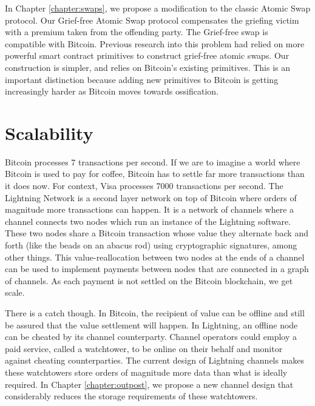 In Chapter \ref{chapter:swaps}, we propose a modification to the classic Atomic Swap protocol. Our Grief-free Atomic Swap protocol compensates the griefing victim with a premium taken from the offending party. The Grief-free swap is compatible with Bitcoin. Previous research into this problem had relied on more powerful smart contract primitives to construct grief-free atomic swaps. Our construction is simpler, and relies on Bitcoin's existing primitives. This is an important distinction because adding new primitives to Bitcoin is getting increasingly harder as Bitcoin moves towards ossification. 

\section{Scalability}
Bitcoin processes 7 transactions per second. If we are to imagine a world where Bitcoin is used to pay for coffee, Bitcoin has to settle far more transactions than it does now. For context, Visa processes 7000 transactions per second. The Lightning Network is a second layer network on top of Bitcoin where orders of magnitude more transactions can happen. It is a network of channels where a channel connects two nodes which run an instance of the Lightning software. These two nodes share a Bitcoin transaction whose value they alternate back and forth (like the beads on an abacus rod) using cryptographic signatures, among other things. This value-reallocation between two nodes at the ends of a channel can be used to implement payments between nodes that are connected in a graph of channels. As each payment is not settled on the Bitcoin blockchain, we get scale. 

There is a catch though. In Bitcoin, the recipient of value can be offline and still be assured that the value settlement will happen. In Lightning, an offline node can be cheated by its channel counterparty. Channel operators could employ a paid service, called a watchtower, to be online on their behalf and monitor against cheating counterparties. The current design of Lightning channels makes these watchtowers store orders of magnitude more data than what is ideally required. In Chapter \ref{chapter:outpost}, we propose a new channel design that considerably reduces the storage requirements of these watchtowers. 

